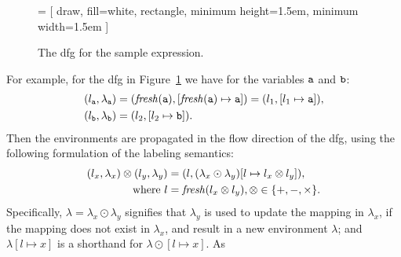 \begin{figure}[ht]
    \centering
     = [
        draw,
        fill=white,
        rectangle,
        minimum height=1.5em,
        minimum width=1.5em
    ]
    \caption{%
        The \gls{dfg} for the sample expression.
    }\label{so:fig:sample_tree}
\end{figure}
For example, for the \gls{dfg} in Figure~\ref{so:fig:sample_tree} we have for
the variables $\texttt{a}$ and $\texttt{b}$:
\begin{equation}
    \begin{aligned}
        (l_{\texttt{a}}, \lambda_{\texttt{a}})
            &= (\operatorname{\mathit{fresh}}(\texttt{a}), [\operatorname{\mathit{fresh}}(\texttt{a})\mapsto{\texttt{a}}])
             = (l_1, [l_1 \mapsto \texttt{a}]), \\
        (l_{\texttt{b}}, \lambda_{\texttt{b}}) &= (l_2, [l_2 \mapsto \texttt{b}]).
    \end{aligned}
    \label{so:eq:variable_env}
\end{equation}
Then the environments are propagated in the flow direction of the \gls{dfg},
using the following formulation of the labeling semantics:
\begin{equation}
    \begin{aligned}
        (l_x, \lambda_x) \otimes (l_y, \lambda_y)
            &= (l, (\lambda_x\odot\lambda_y)
                      [l\mapsto{l_x \otimes l_y}]), \\
            \text{where~} l &= \operatorname{\mathit{fresh}}(l_x \otimes l_y),
                          \otimes\in\{+, -, \times\}.
    \end{aligned}
    \label{so:eq:labeling_semantics}
\end{equation}
Specifically, $\lambda=\lambda_x\odot\lambda_y$ signifies that $\lambda_y$
is used to update the mapping in $\lambda_x$, if the mapping does not
exist in $\lambda_x$, and result in a new environment $\lambda$; and
$\lambda[l\mapsto{x}]$ is a shorthand for $\lambda\odot[l\mapsto{x}]$.  As
